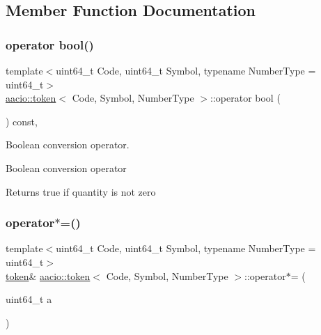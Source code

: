 \subsection{Member Function Documentation}
\mbox{\label{classaacio_1_1token_a0017cdc9c0fe40daa00f695612e1d576}} 
\subsubsection{\texorpdfstring{operator bool()}{operator bool()}}
{\footnotesize\ttfamily template$<$uint64\+\_\+t Code, uint64\+\_\+t Symbol, typename Number\+Type  = uint64\+\_\+t$>$ \\
\mbox{\hyperlink{classaacio_1_1token}{aacio\+::token}}$<$ Code, Symbol, Number\+Type $>$\+::operator bool (\begin{DoxyParamCaption}{ }\end{DoxyParamCaption}) const\hspace{0.3cm}{\ttfamily [inline]}, {\ttfamily [explicit]}}



Boolean conversion operator. 

Boolean conversion operator \begin{DoxyReturn}{Returns}
true if quantity is not zero 
\end{DoxyReturn}
\mbox{\label{classaacio_1_1token_a89ed694ad8844dda040264fd115a8d05}} 
\subsubsection{\texorpdfstring{operator$\ast$=()}{operator*=()}}
{\footnotesize\ttfamily template$<$uint64\+\_\+t Code, uint64\+\_\+t Symbol, typename Number\+Type  = uint64\+\_\+t$>$ \\
\mbox{\hyperlink{classaacio_1_1token}{token}}\& \mbox{\hyperlink{classaacio_1_1token}{aacio\+::token}}$<$ Code, Symbol, Number\+Type $>$\+::operator$\ast$= (\begin{DoxyParamCaption}\item[{uint64\+\_\+t}]{a }\end{DoxyParamCaption})\hspace{0.3cm}{\ttfamily [inline]}}



